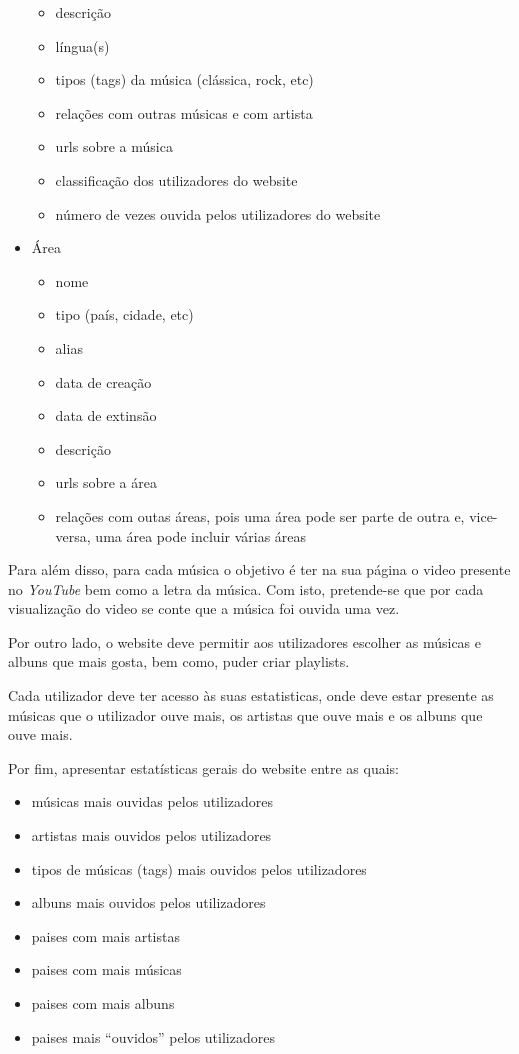 \documentclass{article}
\begin{document}
\begin{itemize}
\begin{itemize}
            \item descrição
            \item língua(s)
            \item tipos (tags) da música (clássica, rock, etc)
            \item relações com outras músicas e com artista
            \item urls sobre a música
            \item classificação dos utilizadores do website
            \item número de vezes ouvida pelos utilizadores do website
        \end{itemize}
    \item Área
        \begin{itemize}
            \item nome
            \item tipo (país, cidade, etc)
            \item alias
            \item data de creação
            \item data de extinsão
            \item descrição
            \item urls sobre a área
            \item relações com outas áreas, pois uma área pode ser parte de outra e, vice-versa, uma área pode incluir várias áreas
        \end{itemize}
\end{itemize}

Para além disso, para cada música o objetivo é ter na sua página o video presente no \textit{YouTube} bem como a letra da música. Com isto, pretende-se que por cada visualização do video se conte que a música foi ouvida uma vez.

Por outro lado, o website deve permitir aos utilizadores escolher as músicas e albuns que mais gosta, bem como, puder criar playlists.

Cada utilizador deve ter acesso às suas estatisticas, onde deve estar presente as músicas que o utilizador ouve mais, os artistas que ouve mais e os albuns que ouve mais.

Por fim, apresentar estatísticas gerais do website entre as quais:
\begin{itemize}
    \item músicas mais ouvidas pelos utilizadores
    \item artistas mais ouvidos pelos utilizadores
    \item tipos de músicas (tags) mais ouvidos pelos utilizadores
    \item albuns mais ouvidos pelos utilizadores
    \item paises com mais artistas
    \item paises com mais músicas
    \item paises com mais albuns
    \item paises mais ``ouvidos'' pelos utilizadores
\end{itemize}
\end{document}

